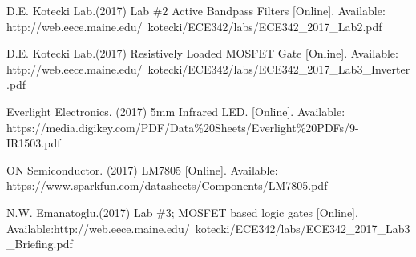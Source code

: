 \documentclass{article}
\begin{document}
\begin{thebibliography}{00}

 D.E. Kotecki Lab.(2017) Lab $\#2$ Active Bandpass Filters [Online]. Available: http://web.eece.maine.edu/~kotecki/ECE342/labs/ECE342\_2017\_Lab2.pdf
\newline

 D.E. Kotecki Lab.(2017) Resistively Loaded MOSFET Gate [Online]. Available: http://web.eece.maine.edu/~kotecki/ECE342/labs/ECE342\_2017\_Lab3\_Inverter.pdf
\newline

 Everlight Electronics. (2017) 5mm Infrared LED. [Online]. Available:
https://media.digikey.com/PDF/Data\%20Sheets/Everlight\%20PDFs/9-IR1503.pdf
\newline


 ON Semiconductor. (2017) LM7805 [Online]. Available: 
https://www.sparkfun.com/datasheets/Components/LM7805.pdf
\newline

  N.W. Emanatoglu.(2017) Lab $\#3$; MOSFET based logic gates [Online]. Available:http://web.eece.maine.edu/~kotecki/ECE342/labs/ECE342\_2017\_Lab3\_Briefing.pdf
\newline



\end{thebibliography}
\end{document}
